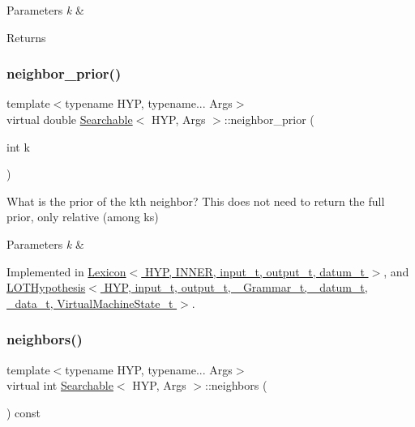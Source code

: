 \begin{DoxyParams}{Parameters}
{\em k} & \\
\hline
\end{DoxyParams}
\begin{DoxyReturn}{Returns}

\end{DoxyReturn}
\mbox{\label{class_searchable_abebbaaf94b0502a35d0ba686af73bd08}} 
\subsubsection{\texorpdfstring{neighbor\+\_\+prior()}{neighbor\_prior()}}
{\footnotesize\ttfamily template$<$typename H\+YP, typename... Args$>$ \\
virtual double \hyperlink{class_searchable}{Searchable}$<$ H\+YP, Args $>$\+::neighbor\+\_\+prior (\begin{DoxyParamCaption}\item[{int}]{k }\end{DoxyParamCaption})\hspace{0.3cm}{\ttfamily [pure virtual]}}



What is the prior of the k\textquotesingle{}th neighbor? This does not need to return the full prior, only relative (among ks) 


\begin{DoxyParams}{Parameters}
{\em k} & \\
\hline
\end{DoxyParams}


Implemented in \hyperlink{class_lexicon_ad237c78e3435223f344d153da3baba9b}{Lexicon$<$ H\+Y\+P, I\+N\+N\+E\+R, input\+\_\+t, output\+\_\+t, datum\+\_\+t $>$}, and \hyperlink{class_l_o_t_hypothesis_a34fb9e13bc6855d6599c1c3e62d88933}{L\+O\+T\+Hypothesis$<$ H\+Y\+P, input\+\_\+t, output\+\_\+t, \+\_\+\+Grammar\+\_\+t, \+\_\+datum\+\_\+t, \+\_\+data\+\_\+t, Virtual\+Machine\+State\+\_\+t $>$}.

\mbox{\label{class_searchable_aec30063fcc9bed5d005f8318efa8492d}} 
\subsubsection{\texorpdfstring{neighbors()}{neighbors()}}
{\footnotesize\ttfamily template$<$typename H\+YP, typename... Args$>$ \\
virtual int \hyperlink{class_searchable}{Searchable}$<$ H\+YP, Args $>$\+::neighbors (\begin{DoxyParamCaption}{ }\end{DoxyParamCaption}) const\hspace{0.3cm}{\ttfamily [pure virtual]}}



